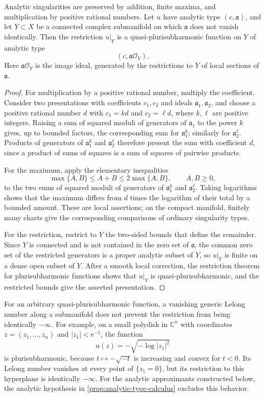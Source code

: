 \begin{proposition}\label{prop:analytic-type-calculus}
Analytic singularities are preserved by addition, finite maxima, and multiplication by positive rational numbers. Let $u$ have analytic type $(c,\mathfrak a)$, and let $Y\subset X$ be a connected complex submanifold on which $\mathfrak a$ does not vanish identically. Then the restriction $u|_Y$ is a quasi-plurisubharmonic function on $Y$ of analytic type
\[
 (c,\mathfrak a\mathcal O_Y).
\]
Here $\mathfrak a\mathcal O_Y$ is the image ideal, generated by the restrictions to $Y$ of local sections of $\mathfrak a$.
\end{proposition}
\begin{proof}
For multiplication by a positive rational number, multiply the coefficient. Consider two presentations with coefficients $c_1,c_2$ and ideals $\mathfrak a_1,\mathfrak a_2$, and choose a positive rational number $d$ with $c_1=k d$ and $c_2=\ell d$, where $k,\ell$ are positive integers. Raising a sum of squared moduli of generators of $\mathfrak a_1$ to the power $k$ gives, up to bounded factors, the corresponding sum for $\mathfrak a_1^k$; similarly for $\mathfrak a_2^\ell$. Products of generators of $\mathfrak a_1^k$ and $\mathfrak a_2^\ell$ therefore present the sum with coefficient $d$, since a product of sums of squares is a sum of squares of pairwise products.

For the maximum, apply the elementary inequalities
\[
 \max\{A,B\}\leq A+B\leq2\max\{A,B\},\qquad A,B\geq0,
\]
to the two sums of squared moduli of generators of $\mathfrak a_1^k$ and $\mathfrak a_2^\ell$. Taking logarithms shows that the maximum differs from $d$ times the logarithm of their total by a bounded amount. These are local assertions; on the compact manifold, finitely many charts give the corresponding comparisons of ordinary singularity types.

For the restriction, restrict to $Y$ the two-sided bounds that define the remainder. Since $Y$ is connected and is not contained in the zero set of $\mathfrak a$, the common zero set of the restricted generators is a proper analytic subset of $Y$, so $u|_Y$ is finite on a dense open subset of $Y$. After a smooth local correction, the restriction theorem for plurisubharmonic functions shows that $u|_Y$ is quasi-plurisubharmonic, and the restricted bounds give the asserted presentation.
\end{proof}

For an arbitrary quasi-plurisubharmonic function, a vanishing generic Lelong number along a submanifold does not prevent the restriction from being identically $-\infty$. For example, on a small polydisk in $\mathbb C^n$ with coordinates $z=(z_1,\ldots,z_n)$ and $|z_1|<\mathrm{e}^{-1}$, the function
\[
 u(z)=-\sqrt{-\log|z_1|^2}
\]
is plurisubharmonic, because $t\mapsto-\sqrt{-t}$ is increasing and convex for $t<0$. Its Lelong number vanishes at every point of $\{z_1=0\}$, but its restriction to this hyperplane is identically $-\infty$. For the analytic approximants constructed below, the analytic hypothesis in \cref{prop:analytic-type-calculus} excludes this behavior.

